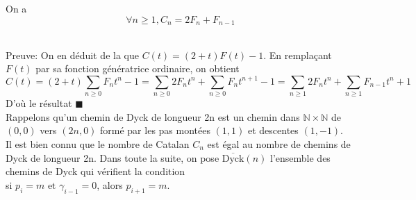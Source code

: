 \text{}\vspace{5pt}
\begin{proposition}\label{cnfn}
	On a \[\forall n\geq 1, C_{n}=2F_{n}+F_{n-1}\]
\end{proposition}
\text{}\\
Preuve:
On en déduit de la  que $C(t)=(2+t)F(t)-1$. En remplaçant $F(t)$ par sa fonction génératrice ordinaire, on obtient
\[C(t)= (2+t)\underset{n\geq0}{\sum}F_{n}t^n -1=\sum_{n\geq 0}2F_{n}t^n+\sum_{n\geq 0} F_{n}
	t^{n+1}-1=\sum_{n\geq 1}2F_{n}t^n+\sum_{n\geq 1} F_{n-1}t^{n}+1\]
D'où le résultat \hspace{5pt}$\blacksquare$ \vspace{10pt}\\
Rappelons qu'un chemin de Dyck de longueur 2n est un chemin dans $\mathbb{N}\times \mathbb{N}$ de $(0, 0)$ vers $(2n, 0)$ formé par les pas montées $(1,1)$
et descentes $(1,-1)$. \\
Il est bien connu que le nombre de Catalan $C_{n}$ est égal au nombre de chemins de Dyck
de longueur 2n. Dans toute la suite, on pose $\overline{\text{Dyck}}(n)$ l'ensemble des chemins de Dyck qui
vérifient la condition\\ si $p_{i}=m \text{ et } \gamma_{i-1}=0$, alors  $p_{i+1}=m$.

